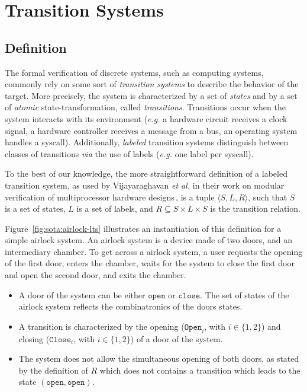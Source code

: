 \documentclass[oneside,a4paper]{memoir}
\theoremstyle{break}
\begin{document}
\section{Transition Systems}
\label{sec:sota:formalisms}

\subsection{Definition}

The formal verification of discrete systems, such as computing systems, commonly
rely on some sort of \emph{transition systems} to describe the behavior of the
target.
%
More precisely, the system is characterized by a set of \emph{states} and by a
set of \emph{atomic} state-transformation, called \emph{transitions}.
%
Transitions occur when the system interacts with its environment (\emph{e.g.} a
hardware circuit receives a clock signal, a hardware controller receives a
message from a bus, an operating system handles a syscall).
%
Additionally, \emph{labeled} transition systems distinguish between classes of
transitions \emph{via} the use of labels (\emph{e.g.} one label per syscall).

To the best of our knowledge, the more straightforward definition of a labeled
transition system, as used by Vijayaraghavan \emph{et al.} in their work on
modular verification of multiprocessor hardware
designs\,\cite{vijayaraghavan2015modular}, is a tuple
\( \langle S, L, R \rangle \), such that \( S \) is a set of states, \( L \) is
a set of labels, and \( R \subseteq S \times L \times S \) is the transition
relation.

\begin{example}
  Figure~\ref{fig:sota:airlock-lts} illustrates an instantiation of this
  definition for a simple airlock system.
  An airlock system is a device made of two doors, and an intermediary chamber.
  To get across a airlock system, a user requests the opening of the first door,
  enters the chamber, waits for the system to close the first door and open the
  second door, and exits the chamber.

  \begin{itemize}
  \item A door of the system can be either \( \mathtt{open} \) or
    \( \mathtt{close} \).
    The set of states of the airlock system reflects the combinatronics of the
    doors states.
  \item A transition is characterized by the opening (\( \mathtt{Open}_i\), with
    \( i \in \{1, 2\} \)) and closing (\( \mathtt{Close}_i \), with
    \( i \in \{1, 2\} \)) of a door of the system.
  \item The system does not allow the simultaneous opening of both doors, as
    stated by the definition of \( R \) which does not contains a transition
    which leads to the state \( (\mathtt{open}, \mathtt{open}) \).
  \end{itemize}
\end{example}
\end{document}
